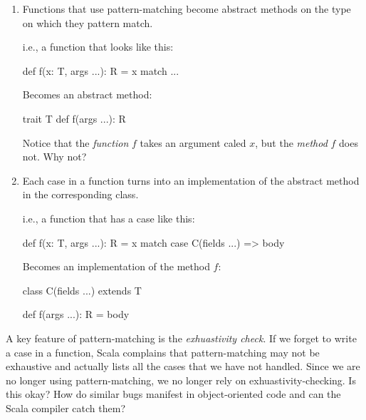 \documentclass{book}
\begin{document}
\begin{enumerate}

  \item Functions that use pattern-matching become abstract methods on the type
  on which they pattern match.

  i.e., a function that looks like this:

  \begin{scalacode}
  def f(x: T, args ...): R = x match { ... }
  \end{scalacode}

  Becomes an abstract method:

  \begin{scalacode}
  trait T {
    def f(args ...): R
  }
  \end{scalacode}

  \begin{think}
  Notice that the \emph{function} $f$ takes an argument caled $x$, but
  the \emph{method} $f$ does not. Why not?
  \end{think}

  \item Each case in a function turns into an implementation of the abstract
  method in the corresponding class.

  i.e., a function that has a case like this:

  \begin{scalacode}
  def f(x: T, args ...): R = x match {
    case C(fields ...) => body
  }
  \end{scalacode}

  Becomes an implementation of the method $f$:

  \begin{scalacode}
  class C(fields ...) extends T {

    def f(args ...): R = body
  }
  \end{scalacode}

\end{enumerate}

\begin{think}
A key feature of pattern-matching is the \emph{exhuastivity check}. If
we forget to write a case in a function, Scala complains that pattern-matching
may not be exhaustive and actually lists all the cases that we have not
handled. Since we are no longer using pattern-matching, we no longer rely
on exhuastivity-checking. Is this okay? How do similar bugs manifest in
object-oriented code and can the Scala compiler catch them?
\end{think}
\end{document}
